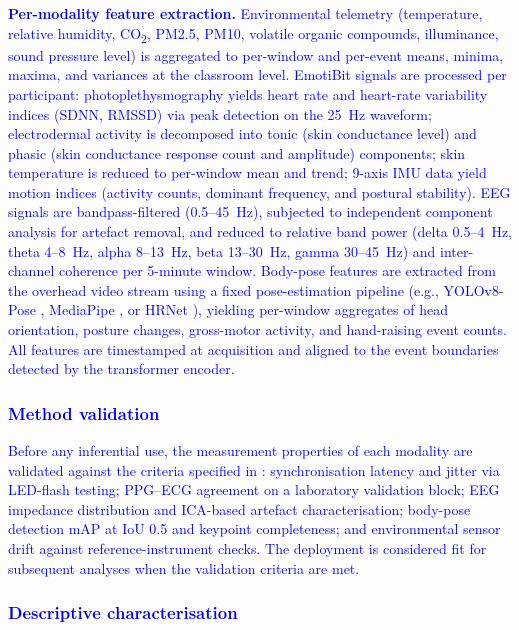 \textcolor{blue}{\textbf{Per-modality feature extraction.} Environmental telemetry (temperature, relative humidity, CO\textsubscript{2}, PM2.5, PM10, volatile organic compounds, illuminance, sound pressure level) is aggregated to per-window and per-event means, minima, maxima, and variances at the classroom level. EmotiBit signals are processed per participant: photoplethysmography yields heart rate and heart-rate variability indices (SDNN, RMSSD) via peak detection on the 25~Hz waveform; electrodermal activity is decomposed into tonic (skin conductance level) and phasic (skin conductance response count and amplitude) components; skin temperature is reduced to per-window mean and trend; 9-axis IMU data yield motion indices (activity counts, dominant frequency, and postural stability). EEG signals are bandpass-filtered (0.5--45~Hz), subjected to independent component analysis for artefact removal, and reduced to relative band power (delta 0.5--4~Hz, theta 4--8~Hz, alpha 8--13~Hz, beta 13--30~Hz, gamma 30--45~Hz) and inter-channel coherence per 5-minute window. Body-pose features are extracted from the overhead video stream using a fixed pose-estimation pipeline (e.g., YOLOv8-Pose \parencite{Jocher2023_yolov8}, MediaPipe \parencite{Lugaresi2019_mediapipe}, or HRNet \parencite{Sun2019_hrnet}), yielding per-window aggregates of head orientation, posture changes, gross-motor activity, and hand-raising event counts. All features are timestamped at acquisition and aligned to the event boundaries detected by the transformer encoder.}

\textcolor{blue}{\subsubsection{Method validation}}

\textcolor{blue}{Before any inferential use, the measurement properties of each modality are validated against the criteria specified in : synchronisation latency and jitter via LED-flash testing; PPG--ECG agreement on a laboratory validation block; EEG impedance distribution and ICA-based artefact characterisation; body-pose detection mAP at IoU 0.5 and keypoint completeness; and environmental sensor drift against reference-instrument checks. The deployment is considered fit for subsequent analyses when the validation criteria are met.}

\textcolor{blue}{\subsubsection{Descriptive characterisation}}

